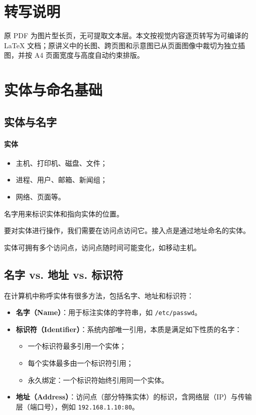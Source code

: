 \section*{转写说明}
原 PDF 为图片型长页，无可提取文本层。本文按视觉内容逐页转写为可编译的 \LaTeX{} 文档；原讲义中的长图、跨页图和示意图已从页面图像中裁切为独立插图，并按 A4 页面宽度与高度自动约束排版。

\section{实体与命名基础}

\subsection{实体与名字}

\paragraph{实体}
\begin{itemize}
  \item 主机、打印机、磁盘、文件；
  \item 进程、用户、邮箱、新闻组；
  \item 网络、页面等。
\end{itemize}

名字用来标识实体和指向实体的位置。

要对实体进行操作，我们需要在访问点访问它。接入点是通过地址命名的实体。

实体可拥有多个访问点，访问点随时间可能变化，如移动主机。

\subsection{名字 vs. 地址 vs. 标识符}

在计算机中称呼实体有很多方法，包括名字、地址和标识符：
\begin{itemize}
  \item \textbf{名字（Name）}：用于标注实体的字符串，如 \texttt{/etc/passwd}。
  \item \textbf{标识符（Identifier）}：系统内部唯一引用，本质是满足如下性质的名字：
  \begin{itemize}
    \item 一个标识符最多引用一个实体；
    \item 每个实体最多由一个标识符引用；
    \item 永久绑定：一个标识符始终引用同一个实体。
  \end{itemize}
  \item \textbf{地址（Address）}：访问点（部分特殊实体）的标识，含网络层（IP）与传输层（端口号），例如 \texttt{192.168.1.10:80}。
\end{itemize}

